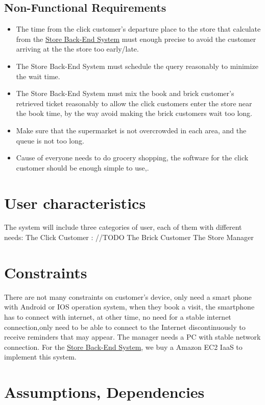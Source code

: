 \documentclass[a4paper,12pt]{book}
\begin{document}
\subsection{Non-Functional Requirements}
\begin{itemize}
	\item The time from the click customer's departure place to the store that calculate from the \hyperref[Definitions]{Store Back-End System} must enough precise to avoid the customer arriving at the the store too early/late.
	\item The Store Back-End System must schedule the query reasonably to minimize the wait time.
	\item The Store Back-End System must mix the book and brick customer's retrieved ticket reasonably to allow the click customers enter the store near the book time, by the way avoid making the brick customers wait too long.
	\item Make sure that the supermarket is not overcrowded in each area, and the queue is not too long.
	\item Cause of everyone needs to do grocery shopping, the software for the click customer should be enough simple to use,.
\end{itemize}

\section{User characteristics}
The system will include three categories of user, each of them with different needs:
The Click Customer : //TODO
The Brick Customer
The Store Manager



\section{Constraints}
There are not many constraints on customer's device, only need a smart phone with Android or IOS operation system, when they book a visit, the smartphone has to connect with internet, at other time, no need for a stable internet connection,only need to be able to connect to the Internet discontinuously to receive reminders that may appear.
The manager needs a PC with stable network connection.
For the \hyperref[Definitions]{Store Back-End System}, we buy a Amazon EC2 IaaS to implement this system.


\section{Assumptions, Dependencies}
\end{document}
